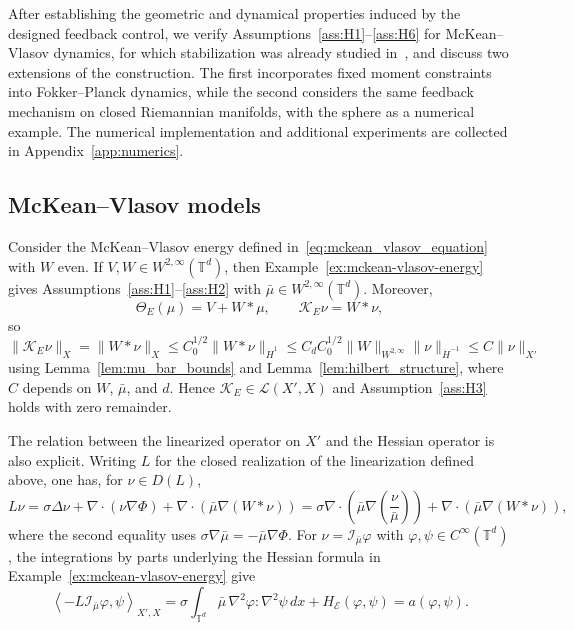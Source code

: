 \documentclass[11pt]{article}
\numberwithin{equation}{section}
\theoremstyle{definition}
\newcommand{\T}{\mathbb{T}}
\newcommand{\E}{\mathcal{E}}
\newcommand{\rieszmap}[1][\mu]{\mathcal{I}_{#1}}
\newcommand{\dotHk}[1][k]{\dot{H}^{#1}}
\newcommand{\dotHminusone}{\dot{H}^{-1}}
\begin{document}
After establishing the geometric and dynamical properties induced by the designed feedback control, we verify Assumptions~\ref{ass:H1}--\ref{ass:H6} for McKean--Vlasov dynamics, for which stabilization was already studied in~\cite{KaliseMoschenPavliotis2025}, and discuss two extensions of the construction.
The first incorporates fixed moment constraints into Fokker--Planck dynamics, while the second considers the same feedback mechanism on closed Riemannian manifolds, with the sphere as a numerical example.
The numerical implementation and additional experiments are collected in Appendix~\ref{app:numerics}.

\subsection{McKean--Vlasov models}
\label{sec:mckean-vlasov-models}

Consider the McKean--Vlasov energy defined in~\eqref{eq:mckean_vlasov_equation} with $W$ even.
If $V, W \in W^{2,\infty}(\T^d)$, then Example~\ref{ex:mckean-vlasov-energy} gives Assumptions~\ref{ass:H1}--\ref{ass:H2} with $\bar\mu \in W^{2,\infty}(\T^d)$.
Moreover,
\[
\Theta_E(\mu) = V + W * \mu, \qquad \mathcal{K}_E \nu = W * \nu,
\]
so $\|\mathcal{K}_E \nu\|_X = \|W * \nu\|_X \le C_0^{1/2} \|W * \nu\|_{\dotHk[1]} \le C_d C_0^{1/2} \|W\|_{W^{2,\infty}} \|\nu\|_{\dotHminusone} \le C \|\nu\|_{X'}$ using Lemma~\ref{lem:mu_bar_bounds} and Lemma~\ref{lem:hilbert_structure}, where $C$ depends on $W$, $\bar\mu$, and $d$.
Hence $\mathcal{K}_E \in \mathcal{L}(X', X)$ and Assumption~\ref{ass:H3} holds with zero remainder.

The relation between the linearized operator on $X'$ and the Hessian operator is also explicit.
Writing $L$ for the closed realization of the linearization defined above, one has, for $\nu \in D(L)$,
\[
L\nu = \sigma\Delta\nu + \nabla\cdot(\nu\nabla\Phi) + \nabla\cdot\left(\bar\mu \nabla(W\ast\nu)\right) = \sigma \nabla \cdot \left(\bar\mu \nabla\left(\frac{\nu}{\bar\mu}\right)\right) + \nabla\cdot\left(\bar\mu\nabla(W\ast\nu)\right),
\]
where the second equality uses $\sigma \nabla \bar\mu = -\bar\mu \nabla\Phi$.
For $\nu=\rieszmap[\bar\mu]\varphi$ with $\varphi,\psi\in C^\infty(\T^d)$, the integrations by parts underlying the Hessian formula in Example~\ref{ex:mckean-vlasov-energy} give
\[
\left\langle -L\rieszmap[\bar\mu]\varphi, \psi\right\rangle_{X', X} = \sigma \int_{\T^d} \bar\mu \,\nabla^2\varphi : \nabla^2\psi \, dx + H_\E(\varphi,\psi) = a(\varphi,\psi).
\]
\end{document}
